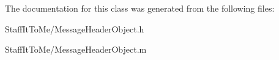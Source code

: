 \-The documentation for this class was generated from the following files\-:\begin{DoxyCompactItemize}
\item 
\-Staff\-It\-To\-Me/\-Message\-Header\-Object.\-h\item 
\-Staff\-It\-To\-Me/\-Message\-Header\-Object.\-m\end{DoxyCompactItemize}
